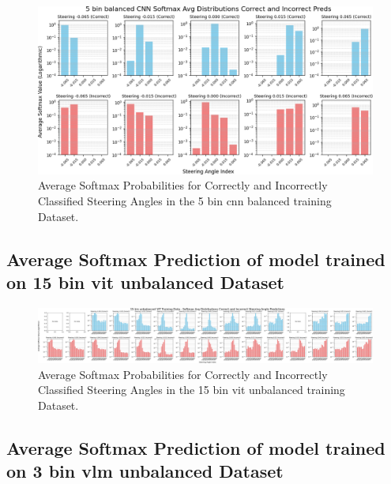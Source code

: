 \begin{figure}[H]
    \centering
    \includegraphics[width=1\linewidth]{Figures/Results/5_bins_cnn_softmax_dist_plot_balanced.png}
    \caption{Average Softmax Probabilities for Correctly and Incorrectly Classified Steering Angles in the 5 bin cnn balanced training Dataset.}
    \label{fig:5_bins_cnn_softmax_dist_balanced}
\end{figure}


\subsection{Average Softmax Prediction of model trained on 15 bin vit unbalanced Dataset}

\begin{figure}[H]
    \centering
    \includegraphics[width=1\linewidth]{Figures/Results/15_bins_vit_softmax_dist_plot_unbalanced.png}
    \caption{Average Softmax Probabilities for Correctly and Incorrectly Classified Steering Angles in the 15 bin vit unbalanced training Dataset.}
    \label{fig:15_bins_vit_softmax_dist_unbalanced}
\end{figure}


\subsection{Average Softmax Prediction of model trained on 3 bin vlm unbalanced Dataset}

